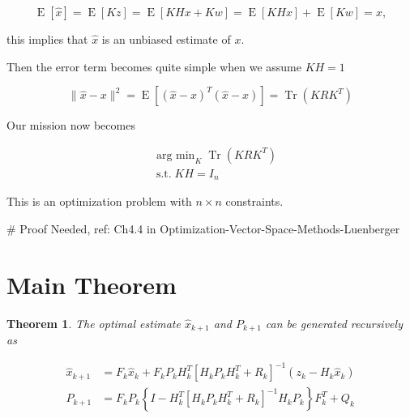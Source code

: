 \documentclass{article}
\DeclareMathOperator*{\argmin}{arg~min}
\newtheorem{theorem}{Theorem}[section]
\begin{document}
            \begin{equation*}
                \operatorname{E}[\hat{x}] = \operatorname{E}\left[
                    Kz \right] = \operatorname{E}\left[ KHx +
                Kw \right] = \operatorname{E}\left[ KHx \right]
                + \operatorname{E}\left[ Kw \right] = x,
            \end{equation*}

            this implies that $ \hat{x} $ is an unbiased estimate of $ x $.

            Then the error term becomes quite simple when we assume $ KH = 1 $

            \begin{equation*}
                 \| \hat{x} - x \|^{2} = \operatorname{E}\left[
                 (\hat{x} - x)^{T} (\hat{x} - x) \right] =
                 \operatorname{Tr}\left( K R K^{T} \right)
            \end{equation*}

            Our mission now becomes

            \begin{align*}
                & \argmin_{K} \operatorname{Tr}\left( K R K^{T} \right) \\
                & \operatorname{s.t.} KH = I_{n}
            \end{align*}

            This is an optimization problem with $ n \times n $ constraints.

            \# Proof Needed, ref: Ch4.4 in Optimization-Vector-Space-Methods-Luenberger

    \section{Main Theorem}

        \begin{theorem}

            The optimal estimate $ \hat{x}_{k+1} $ and $ P_{k+1} $ can be generated
            recursively as

            \begin{align*}
                \hat{x}_{k+1} &= F_{k} \hat{x}_{k} + F_{k} P_{k} H_{k}^{T}\left[
                 H_{k} P_{k} H_{k}^{T} + R_{k} \right]^{-1}\left( z_{k} - H_{k} \hat{x}_{k} \right) \\
                P_{k+1} &= F_{k}P_{k}\left\{ I - H_{k}^{T}\left[ H_{k} P_{k}
                    H_{k}^{T} + R_{k} \right]^{-1} H_{k} P_{k} \right\} F_{k}^{T} +
                    Q_{k}
            \end{align*}

        \end{theorem}
\end{document}
